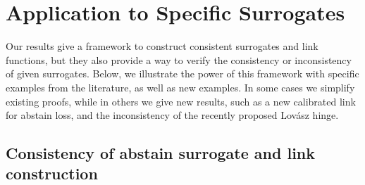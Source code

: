 \documentclass[12pt]{article}
\newcommand{\Comments}{1}
\newcommand{\mytodo}[2]{\ifnum\Comments=1%
  \todo[linecolor=#1!80!black,backgroundcolor=#1,bordercolor=#1!80!black]{#2}\fi}
\newcommand{\btw}[1]{}%
\newcommand{\R}{\mathcal{R}}
\begin{document}
\btw{FUTURE: we should comment in the discussion section that we probably can show that *any* loss embedding $\ell$ must be polyhedral-ish, meaning polyhedral except for stuff that is never optimal.  This theorem would then not need the ``polyhedral'' part. This is related to the ``convex envelope conjucture'', that if $L$ embeds $\ell$ via $\varphi$, you can just take the loss $L'$ such that $L_y$ is the convex envelope of points $\{(\varphi(r),L(r)_y)\}_{r\in\R}$.}
\btw{FUTURE: This prop and theorem give an excellent reason to focus on embeddings, since other techniques do not necessarily give you separated links for free.  Since we know we get them for free, we can just focus on the property, and study elicitation complexity; we know if we have a link at all it can be taken to be separated.  [[Is this true?]]}



\section{Application to Specific Surrogates}\label{sec:examples}

Our results give a framework to construct consistent surrogates and link functions, but they also provide a way to verify the consistency or inconsistency of given surrogates.
Below, we illustrate the power of this framework with specific examples from the literature, as well as new examples.
In some cases we simplify existing proofs, while in others we give new results, such as a new calibrated link for abstain loss, and the inconsistency of the recently proposed Lov\'asz hinge.
\btw{RF: The top-k and hypercube/set examples (except abstain) have the link built in, e.g.\ as the sign function), and they just work around it.  Our results may suggest that it's worth thinking ``outside the box'' (HAH, genious...) and looking for embeddings which are not the hypercube.}

\subsection{Consistency of abstain surrogate and link construction}
\label{sec:abstain}
\end{document}
